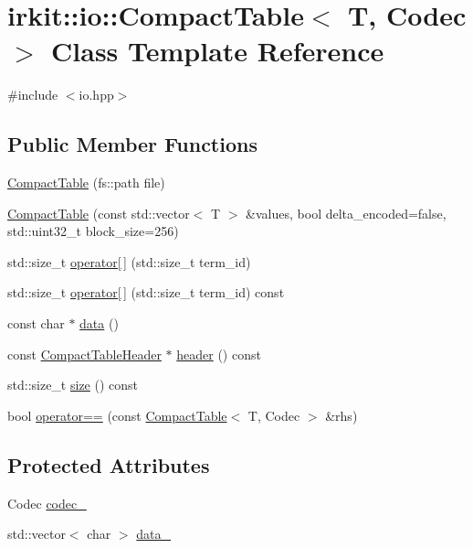 \hypertarget{classirkit_1_1io_1_1CompactTable}{}\section{irkit\+:\+:io\+:\+:Compact\+Table$<$ T, Codec $>$ Class Template Reference}
\label{classirkit_1_1io_1_1CompactTable}


{\ttfamily \#include $<$io.\+hpp$>$}

\subsection*{Public Member Functions}
\begin{DoxyCompactItemize}
\item 
\mbox{\hyperlink{classirkit_1_1io_1_1CompactTable_a8495884f1b4784f9f843097ae57952a9}{Compact\+Table}} (fs\+::path file)
\item 
\mbox{\hyperlink{classirkit_1_1io_1_1CompactTable_aa8377c46672196cf3d37615a5f4fa9fc}{Compact\+Table}} (const std\+::vector$<$ T $>$ \&values, bool delta\+\_\+encoded=false, std\+::uint32\+\_\+t block\+\_\+size=256)
\item 
std\+::size\+\_\+t \mbox{\hyperlink{classirkit_1_1io_1_1CompactTable_a040c59b950270efb9a6e329dd38554ca}{operator\mbox{[}$\,$\mbox{]}}} (std\+::size\+\_\+t term\+\_\+id)
\item 
std\+::size\+\_\+t \mbox{\hyperlink{classirkit_1_1io_1_1CompactTable_a69fc4cea09cb173e227be57fce3d8b90}{operator\mbox{[}$\,$\mbox{]}}} (std\+::size\+\_\+t term\+\_\+id) const
\item 
const char $\ast$ \mbox{\hyperlink{classirkit_1_1io_1_1CompactTable_af89d3739131899e8db186c2d0e625627}{data}} ()
\item 
const \mbox{\hyperlink{structirkit_1_1io_1_1CompactTableHeader}{Compact\+Table\+Header}} $\ast$ \mbox{\hyperlink{classirkit_1_1io_1_1CompactTable_a50d7642c78dc73fd7cfdce870e667603}{header}} () const
\item 
std\+::size\+\_\+t \mbox{\hyperlink{classirkit_1_1io_1_1CompactTable_aa043247ba412d1bde574bf6b08bf8877}{size}} () const
\item 
bool \mbox{\hyperlink{classirkit_1_1io_1_1CompactTable_a2daba70550b6119d1ef13ae24afbe194}{operator==}} (const \mbox{\hyperlink{classirkit_1_1io_1_1CompactTable}{Compact\+Table}}$<$ T, Codec $>$ \&rhs)
\end{DoxyCompactItemize}
\subsection*{Protected Attributes}
\begin{DoxyCompactItemize}
\item 
Codec \mbox{\hyperlink{classirkit_1_1io_1_1CompactTable_a34214e6ffd6236be620e54af4b9af3f9}{codec\+\_\+}}
\item 
std\+::vector$<$ char $>$ \mbox{\hyperlink{classirkit_1_1io_1_1CompactTable_a75795593fd6e9c81d95faa07b4a0618a}{data\+\_\+}}
\end{DoxyCompactItemize}

